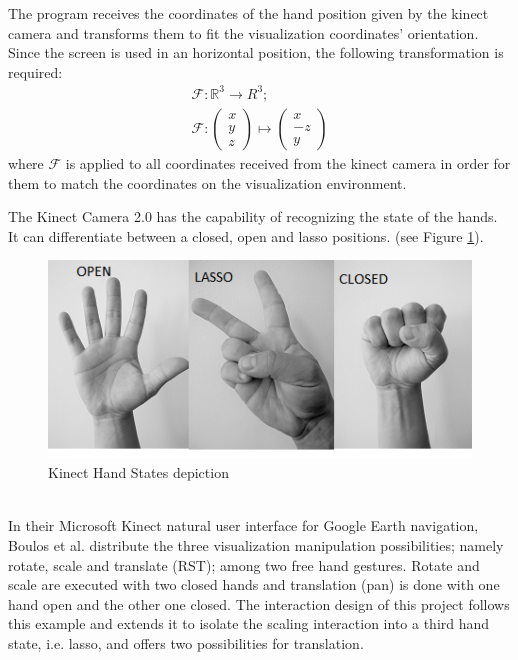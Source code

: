 \documentclass[12pt]{extarticle}
\newcommand{\R}{\mathbb{R}}
\begin{document}
The program receives the coordinates of the hand position given by the kinect camera and transforms them to fit the visualization coordinates\rq{} orientation. Since the screen is used in an horizontal position, the following transformation is required:
$$\begin{array}{c}
\mathcal F: \R^3\to R^3; \\
\mathcal F:\begin{pmatrix} x\\y\\z\end{pmatrix}\mapsto \begin{pmatrix} x\\-z\\y\end{pmatrix}\end{array}$$
where $\mathcal F$ is applied to all coordinates received from the kinect camera in order for them to match the coordinates on the visualization environment.

The Kinect Camera 2.0 has the capability of recognizing the state of the hands. It can differentiate between a closed, open and lasso positions. (see Figure \ref{fig: OCL}).
\begin{figure}[ht!]
\includegraphics[scale=1.5]{Images/KinectHandStates.png}
\caption{Kinect Hand States depiction}
\label{fig: OCL}
\end{figure}\\
In their Microsoft Kinect natural user interface for Google Earth navigation, Boulos et al. \cite{Kinoogle} distribute the three visualization manipulation possibilities; namely rotate, scale and translate (RST); among two free hand gestures. Rotate and scale are executed with two closed hands and translation (pan) is done with one hand open and the other one closed. The interaction design of this project follows this example and extends it to isolate the scaling interaction into a third hand state, i.e. lasso, and offers two possibilities for translation.
\end{document}
